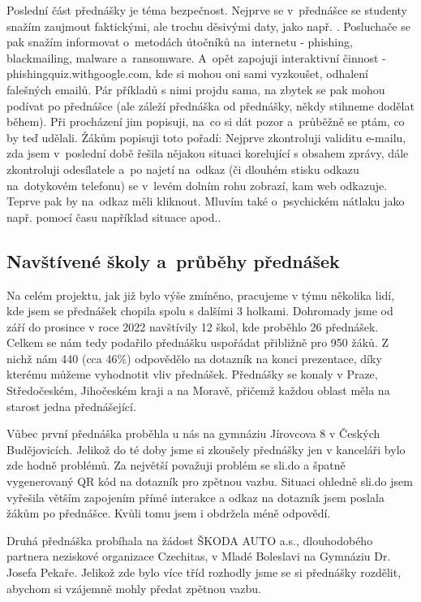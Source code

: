 \documentclass[12pt]{report}			%
\begin{document}
                Poslední část přednášky je téma bezpečnost. Nejprve se v~přednášce se studenty snažím zaujmout faktickými, ale trochu děsivými daty, jako např. . Posluchače se pak snažím informovat o~metodách útočníků na~internetu - phishing, blackmailing, malware a~ransomware. A~opět zapojuji interaktivní činnost - phishingquiz.withgoogle.com, kde si mohou oni sami vyzkoušet, odhalení falešných emailů. Pár příkladů s nimi projdu sama, na zbytek se pak mohou podívat po přednášce (ale záleží přednáška od přednášky, někdy stihneme dodělat během). Při procházení jim popisuji, na~co si dát pozor a~průběžně se ptám, co by teď udělali. Žákům popisuji toto pořadí: Nejprve zkontroluji validitu e-mailu, zda jsem v~poslední době řešila nějakou situaci korelující s obsahem zprávy, dále zkontroluji odesílatele a~po najetí na~odkaz (či dlouhém stisku odkazu na~dotykovém telefonu) se v~levém dolním rohu zobrazí, kam web odkazuje. Teprve pak by na~odkaz měli kliknout. Mluvím také o~psychickém nátlaku jako např. pomocí času například situace  apod..

        \subsection{Navštívené školy a~průběhy přednášek}
                Na celém projektu, jak již bylo výše zmíněno, pracujeme v týmu několika lidí, kde jsem se přednášek chopila spolu s dalšími 3 holkami. Dohromady jsme od září do prosince v roce 2022 navštívily 12 škol, kde proběhlo 26 přednášek. Celkem se nám tedy podařilo přednášku uspořádat přibližně pro 950 žáků. Z nichž nám 440 (cca 46\%) odpovědělo na dotazník na konci prezentace, díky kterému můžeme vyhodnotit vliv přednášek. Přednášky se konaly v Praze, Středočeském, Jihočeském kraji a na Moravě, přičemž každou oblast měla na starost jedna přednášející.  

                Vůbec první přednáška proběhla u nás na gymnáziu Jírovcova 8 v Českých Budějovicích. Jelikož do té doby jsme si zkoušely přednášky jen v kanceláři bylo zde hodně problémů. Za největší považuji problém se sli.do a špatně vygenerovaný QR kód na dotazník pro zpětnou vazbu. Situaci ohledně sli.do jsem vyřešila větším zapojením přímé interakce a odkaz na dotazník jsem poslala žákům po přednášce. Kvůli tomu jsem i obdržela méně odpovědí.

                Druhá přednáška probíhala na žádost ŠKODA AUTO a.s., dlouhodobého partnera neziskové organizace Czechitas, v Mladé Boleslavi na Gymnáziu Dr. Josefa Pekaře. Jelikož zde bylo více tříd rozhodly jsme se si přednášky rozdělit, abychom si vzájemně mohly předat zpětnou vazbu.
\end{document}

